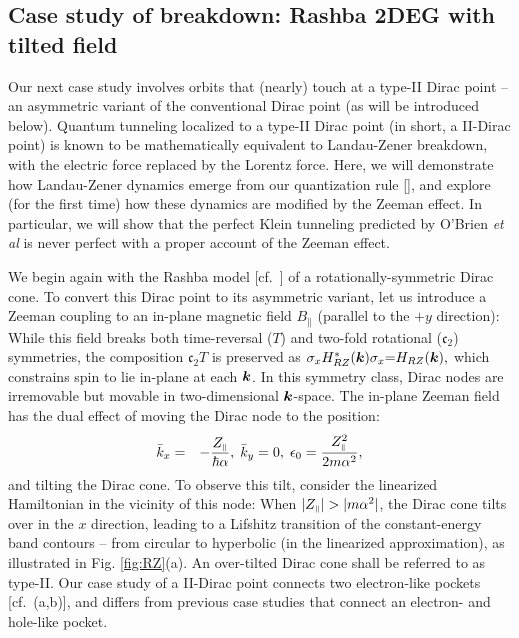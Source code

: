 \documentclass[aps, showpacs, twocolumn, notitlepage, superscriptaddress]{revtex4-1}
\begin{document}
\subsection{Case study of breakdown: Rashba 2DEG with tilted field}\label{sec:inplanezeeman}

Our next case study involves orbits that (nearly) touch at a type-II Dirac point\cite{soluyanov_type-ii_2015,muechler_tilted_2016} -- an asymmetric variant of the conventional Dirac point (as will be introduced below). Quantum tunneling localized to a type-II Dirac point  (in short, a II-Dirac point) is known to be mathematically equivalent to  Landau-Zener breakdown, with the electric force replaced by the Lorentz force\cite{AALG,obrien_magnetic_2016,kane_blount}. Here, we will demonstrate how Landau-Zener dynamics emerge from our quantization rule [], and explore (for the first time) how these dynamics are modified by the Zeeman effect. In particular, we will show that the perfect Klein tunneling predicted by O'Brien \textit{et al}\cite{obrien_magnetic_2016} is never perfect with a proper account of the Zeeman effect.

We begin again with the Rashba model [cf.\ ] of a rotationally-symmetric Dirac cone. To convert this Dirac point to its asymmetric variant, 
let us introduce a Zeeman coupling to an in-plane magnetic field $B_\parallel$ (parallel to the $+y$ direction):
While this field breaks both time-reversal ($T$) and two-fold rotational ($\mathfrak{c}_2$) symmetries, the composition $\mathfrak{c}_2T$ is preserved as $\sigma_x H^*_{RZ}(\boldsymbol{k})\sigma_x{=}H_{RZ}(\boldsymbol{k}),$ which constrains spin to lie in-plane at each $\boldsymbol{k}$. In this symmetry class, Dirac nodes are irremovable but movable in two-dimensional $\boldsymbol{k}$-space. The in-plane Zeeman field has the dual effect of moving the Dirac node  to the position:
\begin{eqnarray}
\bar{k}_x & = & -\frac{Z_{\scriptscriptstyle{\parallel}}}{\hbar\alpha},\;\bar{k}_y=0,\;\epsilon_{0}=\frac{Z_{\scriptscriptstyle{\parallel}}^{2}}{2m\alpha^2},\label{whereisdiracpoint}
\end{eqnarray}
and tilting the Dirac cone. To observe this tilt, consider the linearized Hamiltonian in the vicinity of this node: 
When $|\zpar|>|m\alpha^2|$, the Dirac cone tilts over in the $x$ direction, leading to a Lifshitz transition  of the constant-energy band contours -- from circular to hyperbolic (in the linearized approximation), as illustrated in Fig. \ref{fig:RZ}(a). An over-tilted Dirac cone shall be referred to as type-II. Our case study of a II-Dirac point  connects  two electron-like  pockets [cf.\ (a,b)], and  differs from previous case studies\cite{obrien_magnetic_2016,AALG} that connect an electron- and hole-like pocket.
\end{document}
